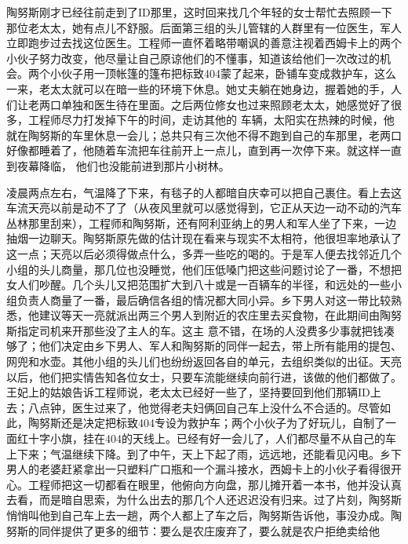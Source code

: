 \documentclass{article}
\begin{document}
陶努斯刚才已经往前走到了ID那里，这时回来找几个年轻的女士帮忙去照顾一下那位老太太，她有点儿不舒服。后面第三组的头儿管辖的人群里有一位医生，军人立即跑步过去找这位医生。工程师一直怀着略带嘲讽的善意注视着西姆卡上的两个小伙子努力改变，他尽量让自己原谅他们的不懂事，知道该给他们一次改过的机会。两个小伙子用一顶帐篷的篷布把标致404蒙了起来，卧铺车变成救护车，这么一来，老太太就可以在暗一些的环境下休息。她丈夫躺在她身边，握着她的手，人们让老两口单独和医生待在里面。之后两位修女也过来照顾老太太，她感觉好了很多，工程师尽力打发掉下午的时间，走访其他的
\newpage
车辆，太阳实在热辣的时候，他就在陶努斯的车里休息一会儿；总共只有三次他不得不跑到自己的车那里，老两口好像都睡着了，他随着车流把车往前开上一点儿，直到再一次停下来。就这样一直到夜幕降临，
他们也没能前进到那片小树林。 

凌晨两点左右，气温降了下来，有毯子的人都暗自庆幸可以把自己裹住。看上去这车流天亮以前是动不了了（从夜风里就可以感觉得到，它正从天边一动不动的汽车丛林那里刮来），工程师和陶努斯，还有阿利亚纳上的男人和军人坐了下来，一边抽烟一边聊天。陶努斯原先做的估计现在看来与现实不太相符，他很坦率地承认了这一点；天亮以后必须得做点什么，多弄一些吃的喝的。于是军人便去找邻近几个小组的头儿商量，那几位也没睡觉，他们压低嗓门把这些问题讨论了一番，不想把女人们吵醒。几个头儿又把范围扩大到八十或是一百辆车的半径，和远处的一些小组负责人商量了一番，最后确信各组的情况都大同小异。乡下男人对这一带比较熟悉，他建议等天一亮就派出两三个男人到附近的农庄里去买食物，在此期间由陶努斯指定司机来开那些没了主人的车。这主
\newpage
意不错，在场的人没费多少事就把钱凑够了；他们决定由乡下男人、军人和陶努斯的同伴一起去，带上所有能用的提包、网兜和水壶。其他小组的头儿们也纷纷返回各自的单元，去组织类似的出征。天亮以后，他们把实情告知各位女士，只要车流能继续向前行进，该做的他们都做了。王妃上的姑娘告诉工程师说，老太太已经好一些了，坚持要回到他们那辆ID上去；八点钟，医生过来了，他觉得老夫妇俩回自己车上没什么不合适的。尽管如此，陶努斯还是决定把标致404专设为救护车；两个小伙子为了好玩儿，自制了一面红十字小旗，挂在404的天线上。已经有好一会儿了，人们都尽量不从自己的车上下来；气温继续下降。到了中午，天上下起了雨，远远地，还能看见闪电。乡下男人的老婆赶紧拿出一只塑料广口瓶和一个漏斗接水，西姆卡上的小伙子看得很开心。工程师把这一切都看在眼里，他俯向方向盘，那儿摊开着一本书，他并没认真去看，而是暗自思索，为什么出去的那几个人还迟迟没有归来。过了片刻，陶努斯悄悄叫他到自己车上去一趟，两个人都上了车之后，陶努斯告诉他，事没办成。陶努斯的同伴提供了更多的细节：要么是农庄废弃了，要么就是农户拒绝卖给他
\newpage
\end{document}
